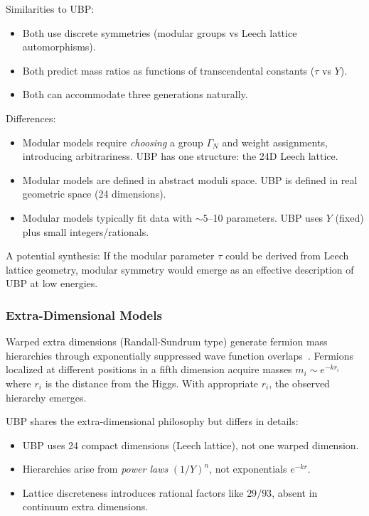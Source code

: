 \documentclass[11pt,a4paper]{article}
\begin{document}
Similarities to UBP:
\begin{itemize}
\item Both use discrete symmetries (modular groups vs Leech lattice automorphisms).
\item Both predict mass ratios as functions of transcendental constants ($\tau$ vs $Y$).
\item Both can accommodate three generations naturally.
\end{itemize}

Differences:
\begin{itemize}
\item Modular models require \emph{choosing} a group $\Gamma_N$ and weight assignments, introducing arbitrariness. UBP has one structure: the 24D Leech lattice.
\item Modular models are defined in abstract moduli space. UBP is defined in real geometric space (24 dimensions).
\item Modular models typically fit data with $\sim 5$--10 parameters. UBP uses $Y$ (fixed) plus small integers/rationals.
\end{itemize}

A potential synthesis: If the modular parameter $\tau$ could be derived from Leech lattice geometry, modular symmetry would emerge as an effective description of UBP at low energies.

\subsubsection{Extra-Dimensional Models}

Warped extra dimensions (Randall-Sundrum type) generate fermion mass hierarchies through exponentially suppressed wave function overlaps~\cite{ref002}. Fermions localized at different positions in a fifth dimension acquire masses $m_i \sim e^{-k r_i}$ where $r_i$ is the distance from the Higgs. With appropriate $r_i$, the observed hierarchy emerges.

UBP shares the extra-dimensional philosophy but differs in details:
\begin{itemize}
\item UBP uses 24 compact dimensions (Leech lattice), not one warped dimension.
\item Hierarchies arise from \emph{power laws} $(1/Y)^n$, not exponentials $e^{-kr}$.
\item Lattice discreteness introduces rational factors like $29/93$, absent in continuum extra dimensions.
\end{itemize}
\end{document}
